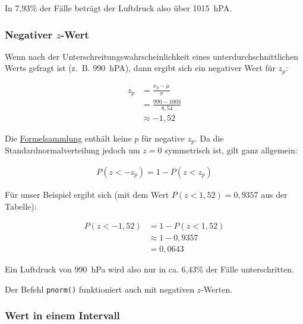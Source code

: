 \documentclass[
  11pt,
  ngerman,
  a4paper,
]{report}
\newenvironment{rtip}{
  \medskip
  \begin{tcolorbox}[colframe=purple,colback=light_gray,title=Softwarehinweis]
}{
  \end{tcolorbox}
  \medskip
}
\begin{document}
In 7,93\% der Fälle beträgt der Luftdruck also über 1015~hPA.

\hypertarget{negativer-z-wert}{%
\subsubsection{\texorpdfstring{Negativer \(z\)-Wert}{Negativer z-Wert}}\label{negativer-z-wert}}

Wenn nach der Unterschreitungswahrscheinlichkeit eines unterdurchschnittlichen Werts gefragt ist (z.~B. 990~hPA), dann ergibt sich ein negativer Wert für \(z_p\):

\begin{equation}
  \begin{aligned}
    z_p &= \frac{x_p-\mu}{\sigma} \\[4pt]
        &= \frac{990-1003}{8{,}54} \\[4pt]
        &\approx -1{,}52
  \end{aligned}
\end{equation}

Die \href{Formelsammlung\%20und\%20Wertetabellen.pdf}{Formelsammlung} enthält keine \(p\) für negative \(z_p\). Da die Standardnormalverteilung jedoch um \(z=0\) symmetrisch ist, gilt ganz allgemein:

\[
  \begin{aligned}
    P(z < -z_p) = 1 - P(z < z_p)
  \end{aligned}
  \label{eq:neg}
\]

Für unser Beispiel ergibt sich (mit dem Wert \(P(z < 1,52) = 0{,}9357\) aus der Tabelle):

\[
  \begin{aligned}
    P(z < -1,52) &= 1 - P(z < 1,52) \\
    &\approx 1-0{,}9357 \\
    &=0{,}0643
  \end{aligned}
\]

Ein Luftdruck von 990~hPa wird also nur in ca. 6,43\% der Fälle unterschritten.

\begin{rtip}
Der Befehl \verb|pnorm()| funktioniert auch mit negativen $z$-Werten.
\end{rtip}

\hypertarget{wert-in-einem-intervall}{%
\subsubsection{Wert in einem Intervall}\label{wert-in-einem-intervall}}
\end{document}
